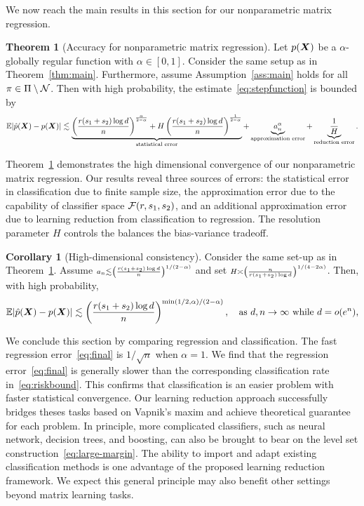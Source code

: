 \documentclass[11pt]{article}
\newcommand*{\KeepStyleUnderBrace}[1]{%
\mathop{%
\mathchoice
{\underbrace{\displaystyle#1}}%
{\underbrace{\textstyle#1}}%
{\underbrace{\scriptstyle#1}}%
{\underbrace{\scriptscriptstyle#1}}%
}\limits
}
\theoremstyle{definition}
\newtheorem{thm}{Theorem}[section]
\newtheorem{corollary}{Corollary}[section]
\begin{document}
We now reach the main results in this section for our nonparametric matrix regression. 

\begin{thm}[Accuracy for nonparametric matrix regression]\label{thm:regression} Let $p(\bm X)$ be a $\alpha$-globally regular function with $\alpha\in[0,1]$. Consider the same setup as in Theorem~\ref{thm:main}. Furthermore, assume Assumption~\ref{ass:main} holds for all $\pi\in\Pi\setminus \mathcal{N}$. Then with high probability, the estimate~\eqref{eq:stepfunction} is bounded by
\[
\mathbb{E}|\hat p(\mX)- p(\mX)| \lesssim  \KeepStyleUnderBrace{
\left({r(s_1+s_2)\log d\over n}\right)^{\alpha\over 2-\alpha}+H\left({r(s_1+s_2)\log d\over n}\right)^{1\over 2-\alpha}}_{\text{statistical error}} + \KeepStyleUnderBrace{a^\alpha_n}_{\text{approximation error}}+\KeepStyleUnderBrace{{1\over H}}_{\text{reduction error}}.
\]
\end{thm}

Theorem~\ref{thm:regression} demonstrates the high dimensional convergence of our nonparametric matrix regression. Our results reveal three sources of errors: the statistical error in classification due to finite sample size, the approximation error due to the capability of classifier space $\mathcal{F}(r,s_1,s_2)$, and an additional approximation error due to learning reduction from classification to regression. The resolution parameter $H$ controls the balances the bias-variance tradeoff. 

\begin{corollary}[High-dimensional consistency] Consider the same set-up as in Theorem~\ref{thm:regression}. Assume $\scriptstyle a_n \lesssim \left({r(s_1+s_2)\log d \over n}\right)^{1/(2-\alpha)}$ and set $\scriptstyle H\asymp \left({n\over r(s_1+s_2) \log d}\right)^{1/(4-2\alpha)}$. Then, with high probability,
\begin{equation}\label{eq:final}
\mathbb{E}|\hat p(\bm X)- p(\bm X)| \lesssim \left({r(s_1+s_2)\log d \over n}\right)^{\min(1/2,\alpha)/(2-\alpha)}, \quad \text{as }d, n\to\infty \text{ while } d=o(e^{n}),
\end{equation}
\end{corollary}

We conclude this section by comparing regression and classification. The fast regression error~\eqref{eq:final} is $1/\sqrt{n}$ when $\alpha=1$. 
We find that the regression error~\eqref{eq:final} is generally slower than the corresponding classification rate in~\eqref{eq:riskbound}. This confirms that classification is an easier problem with faster statistical convergence. Our learning reduction approach successfully bridges theses tasks based on Vapnik's maxim and achieve theoretical guarantee for each problem. In principle, more complicated classifiers, such as neural network, decision trees, and boosting, can also be brought to bear on the level set construction~\eqref{eq:large-margin}. The ability to import and adapt existing classification methods is one advantage of the proposed learning reduction framework. We expect this general principle may also benefit other settings beyond matrix learning tasks.  
\end{document}
